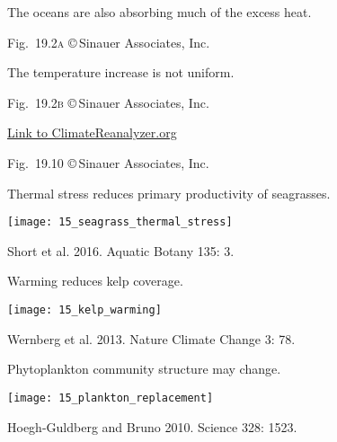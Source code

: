 \documentclass[t]{beamer}
\begin{document}
{
\begin{frame}[b]{The oceans are also absorbing much of the excess heat.}

	\hfill \tiny Fig.~19.2\textsc{a} \copyright\,Sinauer Associates, Inc.

\end{frame}
}
%
{
\begin{frame}[b]{The temperature increase is not uniform.}

	\hfill \tiny Fig.~19.2\textsc{b} \copyright\,Sinauer Associates, Inc.

\end{frame}
}
%
{
\begin{frame}[b]

	\hfill \tiny \href{https://climatereanalyzer.org/wx/DailySummary/\#t2anom}{Link to ClimateReanalyzer.org}

\end{frame}
}
%
{
\begin{frame}[b]

	\hfill \tiny Fig.~19.10 \copyright\,Sinauer Associates, Inc.

\end{frame}
}
%
\begin{frame}[t]{Thermal stress reduces primary productivity of seagrasses.}
	
	\texttt{[image: 15\_seagrass\_thermal\_stress]}\par
	
	\vfilll
	
	\hfill \tiny Short et al. 2016. Aquatic Botany 135: 3.

\end{frame}
%
\begin{frame}[t]{Warming reduces kelp coverage.}

	\texttt{[image: 15\_kelp\_warming]}
	
	\vfilll
	
	\hfill \tiny Wernberg et al. 2013. Nature Climate Change 3: 78.
	
\end{frame}
%
\begin{frame}[t]{Phytoplankton community structure may change.}

	\texttt{[image: 15\_plankton\_replacement]}
	
	\vfilll
	
	\hfill \tiny Hoegh-Guldberg and Bruno 2010. Science 328: 1523.
	
\end{frame}
\end{document}
